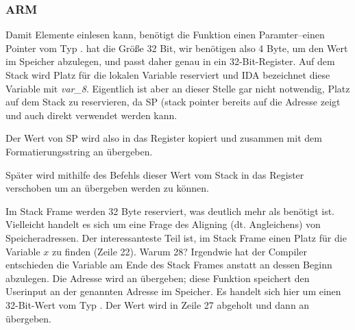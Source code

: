 \subsubsection{ARM}

\myparagraph{\OptimizingKeilVI (\ThumbMode)}



\myindex{\CLanguageElements!\Pointers}
Damit \scanf Elemente einlesen kann, benötigt die Funktion einen Paramter--einen Pointer vom Typ \Tint.
\Tint hat die Größe 32 Bit, wir benötigen also 4 Byte, um den Wert im Speicher abzulegen, und passt daher genau in ein 32-Bit-Register.
Auf dem Stack wird Platz für die lokalen Variable  reserviert und IDA bezeichnet diese Variable mit \emph{var\_8}. 
Eigentlich ist aber an dieser Stelle gar nicht notwendig, Platz auf dem Stack zu reservieren, da \ac{SP} (\gls{stack pointer} 
bereits auf die Adresse zeigt und auch direkt verwendet werden kann.

Der Wert von \ac{SP} wird also in das  Register kopiert und zusammen mit dem Formatierungsstring an \scanf übergeben.



Später wird mithilfe des  Befehls dieser Wert vom Stack in das  Register verschoben um an \printf übergeben werden zu können.




Im Stack Frame werden 32 Byte reserviert, was deutlich mehr als benötigt ist. Vielleicht handelt es sich um eine Frage des Aligning (dt. Angleichens) von Speicheradressen.
Der interessanteste Teil ist, im Stack Frame einen Platz für die Variable $x$ zu finden (Zeile 22).
Warum 28? Irgendwie hat der Compiler entschieden die Variable am Ende des Stack Frames anstatt an dessen Beginn abzulegen.
Die Adresse wird an \scanf übergeben; diese Funktion speichert den Userinput an der genannten Adresse im Speicher.
Es handelt sich hier um einen 32-Bit-Wert vom Typ \Tint. 
Der Wert wird in Zeile 27 abgeholt und dann an \printf übergeben.


